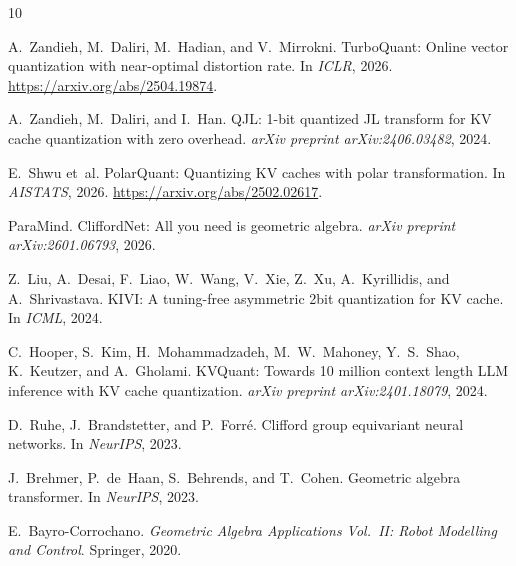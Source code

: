 \documentclass[10pt,twocolumn]{article}
\begin{document}

\begin{thebibliography}{10}

A.~Zandieh, M.~Daliri, M.~Hadian, and V.~Mirrokni.
\newblock TurboQuant: Online vector quantization with near-optimal distortion rate.
\newblock In \emph{ICLR}, 2026.
\newblock \url{https://arxiv.org/abs/2504.19874}.

A.~Zandieh, M.~Daliri, and I.~Han.
\newblock QJL: 1-bit quantized {JL} transform for {KV} cache quantization with zero overhead.
\newblock \emph{arXiv preprint arXiv:2406.03482}, 2024.

E.~Shwu et~al.
\newblock PolarQuant: Quantizing {KV} caches with polar transformation.
\newblock In \emph{AISTATS}, 2026.
\newblock \url{https://arxiv.org/abs/2502.02617}.

ParaMind.
\newblock CliffordNet: All you need is geometric algebra.
\newblock \emph{arXiv preprint arXiv:2601.06793}, 2026.

Z.~Liu, A.~Desai, F.~Liao, W.~Wang, V.~Xie, Z.~Xu, A.~Kyrillidis, and A.~Shrivastava.
\newblock KIVI: A tuning-free asymmetric 2bit quantization for {KV} cache.
\newblock In \emph{ICML}, 2024.

C.~Hooper, S.~Kim, H.~Mohammadzadeh, M.~W.~Mahoney, Y.~S.~Shao, K.~Keutzer, and A.~Gholami.
\newblock KVQuant: Towards 10 million context length {LLM} inference with {KV} cache quantization.
\newblock \emph{arXiv preprint arXiv:2401.18079}, 2024.

D.~Ruhe, J.~Brandstetter, and P.~Forr{\'e}.
\newblock Clifford group equivariant neural networks.
\newblock In \emph{NeurIPS}, 2023.

J.~Brehmer, P.~de~Haan, S.~Behrends, and T.~Cohen.
\newblock Geometric algebra transformer.
\newblock In \emph{NeurIPS}, 2023.

E.~Bayro-Corrochano.
\newblock \emph{Geometric Algebra Applications Vol.\ II: Robot Modelling and Control}.
\newblock Springer, 2020.

\end{thebibliography}
\end{document}
